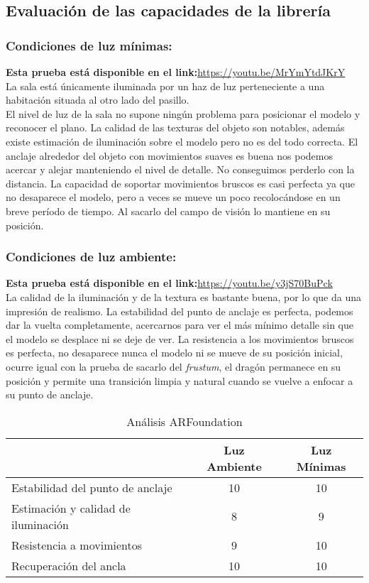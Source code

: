 \subsection{Evaluación de las capacidades de la librería}
\subsubsection{Condiciones de luz mínimas:}
\textbf{Esta prueba está disponible en el link:}\url{https://youtu.be/MrYmYtdJKrY}\\

La sala está únicamente iluminada por un haz de luz perteneciente a una habitación situada al otro lado del pasillo.\\

El nivel de luz de la sala no supone ningún problema para posicionar el modelo y reconocer el plano. La calidad de las texturas del objeto son notables, además existe estimación de iluminación sobre el modelo pero no es del todo correcta. El anclaje alrededor del objeto con movimientos suaves es buena nos podemos acercar y alejar manteniendo el nivel de detalle. No conseguimos perderlo con la distancia. La capacidad de soportar movimientos bruscos es casi perfecta ya que no desaparece el modelo, pero a veces se mueve un poco recolocándose en un breve período de tiempo. Al sacarlo del campo de visión lo mantiene en su posición.

\subsubsection{Condiciones de luz ambiente:}
\textbf{Esta prueba está disponible en el link:}\url{https://youtu.be/y3jS70BuPck}\\

La calidad de la iluminación y de la textura es bastante buena, por lo que da una impresión de realismo. La estabilidad del punto de anclaje es perfecta, podemos dar la vuelta completamente, acercarnos para ver el más mínimo detalle sin que el modelo se desplace ni se deje de ver. La resistencia a los movimientos bruscos es perfecta, no desaparece nunca el modelo ni se mueve de su posición inicial, ocurre igual con la prueba de sacarlo del \textit{frustum}, el dragón permanece en su posición y permite una transición limpia y natural cuando se vuelve a enfocar a su punto de anclaje.

\begin{table}[H]
    \centering
  \begin{tabular}{|l|c|c|}
    \hline
          & Luz Ambiente & Luz Mínimas \\
         \hline
        Estabilidad del punto de anclaje   &10 &10\\
        \hline
        Estimación y calidad de iluminación  &8 &9 \\
        \hline
        Resistencia a movimientos  &9 &10 \\
        \hline
        Recuperación del ancla  &10 &10 \\
      \hline
    \end{tabular}
    \caption{Análisis ARFoundation}
    \label{tab:ARFoundation}
\end{table}
